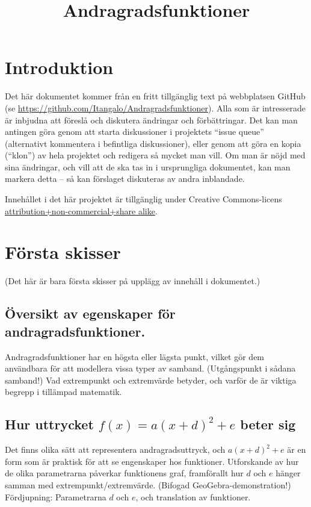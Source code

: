 \documentclass[12pt]{article}
\title{Andragradsfunktioner}
\date{}
\begin{document}
  \maketitle
  
  
  
  \section{Introduktion}
  Det här dokumentet kommer från en fritt tillgänglig text på webbplatsen GitHub (se \url{https://github.com/Itangalo/Andragradsfunktioner}).
  Alla som är intresserade är inbjudna att föreslå och diskutera ändringar och förbättringar.
  Det kan man antingen göra genom att starta diskussioner i projektets ``issue queue'' (alternativt kommentera i befintliga diskussioner), eller genom att göra en kopia (``klon'') av hela projektet och redigera så mycket man vill.
  Om man är nöjd med sina ändringar, och vill att de ska tas in i ursprungliga dokumentet, kan man markera detta -- så kan förslaget diskuteras av andra inblandade.

  Innehållet i det här projektet är tillgänglig under Creative Commons-licens \href{http://creativecommons.org/licenses/by-nc-sa/3.0/}{attribution+non-commercial+share alike}.


  \section{Första skisser}
  
  (Det här är bara första skisser på upplägg av innehåll i dokumentet.)

  \subsection{Översikt av egenskaper för andragradsfunktioner.}
  Andragradsfunktioner har en högsta eller lägsta punkt, vilket gör dem användbara för att modellera vissa typer av samband.
  (Utgångspunkt i sådana samband!)
  Vad extrempunkt och extremvärde betyder, och varför de är viktiga begrepp i tillämpad matematik.

  \subsection{Hur uttrycket $f(x) = a(x+d)^2+e$ beter sig}
  Det finns olika sätt att representera andragradsuttryck, och $a(x+d)^2+e$ är en form som är praktisk för att se engenskaper hos funktioner.
  Utforskande av hur de olika parametrarna påverkar funktionens graf, framförallt hur $d$ och $e$ hänger samman med extrempunkt/extremvärde.
  (Bifogad GeoGebra-demonstration!)
  Fördjupning: Parametrarna $d$ och $e$, och translation av funktioner.
  
\end{document}
